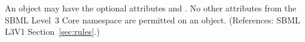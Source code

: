 An \AlgebraicRule object may have the optional attributes  
and .  No other attributes from the SBML Level~3 Core
namespace are permitted on an \AlgebraicRule object.  (References: SBML
L3V1 Section~\ref{sec:rules}.)
